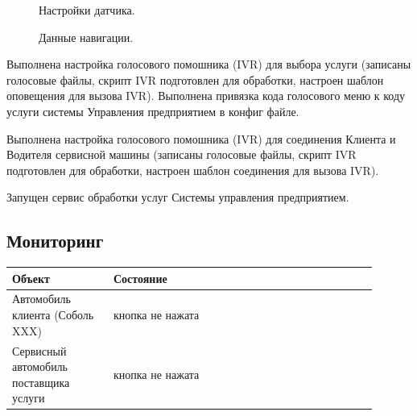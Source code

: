 \documentclass[russian,utf8,12pt,emptystyle]{eskdtext}
\begin{document}
    \begin{figure}[h]
    \begin{center}
    \end{center}
    \caption{Настройки датчика.}
    \label{ris:imagemod02}
    \end{figure}
    \begin{figure}[h]
    \begin{center}
    \end{center}
    \caption{Данные навигации.}
    \label{ris:imagemod03}
    \end{figure} 
\newpage
    
Выполнена настройка голосового помошника (IVR) для выбора услуги (записаны голосовые файлы, скрипт IVR подготовлен для обработки, настроен шаблон оповещения для вызова IVR). Выполнена привязка кода голосового меню к коду услуги системы Управления предприятием в конфиг файле.\label{begin01}

Выполнена настройка голосового помошника (IVR) для соединения Клиента и Водителя сервисной машины (записаны голосовые файлы, скрипт IVR подготовлен для обработки, настроен шаблон соединения для вызова IVR).\label{begin02}

Запущен сервис обработки услуг Системы управления предприятием.  
\newpage       
\subsection{Мониторинг}
\begin{longtable}[h]{|p{0.25\linewidth}|p{0.65\linewidth}|}
\hline
\textbf{Объект}& \textbf{Состояние}\\
\hline
Автомобиль клиента (Соболь XXX)& кнопка не нажата\\
\hline
Сервисный автомобиль поставщика услуги& кнопка не нажата\\
\hline
\end{longtable}
\end{document}
